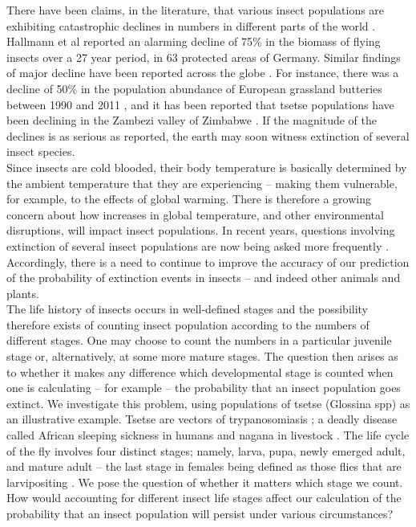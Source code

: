 \documentclass[smallextended]{svjour3}
\begin{document}
There have been claims, in the literature, that various insect populations are exhibiting catastrophic declines in numbers in different parts of the world \cite{Conrad2002,Potts2010,Ilyinykh2011,VanSwaay2013,Lister2018}. Hallmann et al \cite{Hallmann2017} reported an alarming decline of 75\% in the biomass of flying insects over a 27 year period, in 63 protected areas of Germany. Similar findings of major decline have been reported across the globe \cite{Habel2015,Pelton2019}. For instance, there was a decline of 50\% in the population abundance of European grassland butteries between 1990 and 2011 \cite{VanSwaay2013}, and it has been reported that tsetse populations have been declining in the Zambezi valley of Zimbabwe \cite{Lord2018}. If the magnitude of the declines is as serious as reported, the earth may soon witness extinction of several insect species.\\


  
Since insects are cold blooded, their body temperature is basically determined by the ambient temperature that they are experiencing – making them vulnerable, for example, to the effects of global warming. There is therefore a growing concern about how increases in global temperature, and other environmental disruptions, will impact insect populations. In recent years, questions involving extinction of several insect populations are now being asked more frequently \cite{Nilsson2017}. Accordingly, there is a need to continue to improve the accuracy of our prediction of the probability of extinction events in insects – and indeed other animals and plants. \\


The life history of insects occurs in well-defined stages and the possibility therefore exists of counting insect population according to the numbers of different stages. One may choose to count the numbers in a particular juvenile stage or, alternatively, at some more mature stages. The question then arises as to whether it makes any difference which developmental stage is counted when one is calculating – for example – the probability that an insect population goes extinct.  We investigate this problem, using populations of tsetse (Glossina spp) as an illustrative example. Tsetse are vectors of trypanosomiasis \cite{Wamwiri2016,Kioy2004}; a deadly disease called African sleeping sickness in humans and nagana in livestock \cite{Kioy2004}. The life cycle of the fly involves four distinct stages; namely, larva, pupa, newly emerged adult, and mature adult – the last stage in females being defined as those flies that are larvipositing \cite{Ackley2017a}. We pose the question of whether it matters which stage we count. How would accounting for different insect life stages affect our calculation of the probability that an insect population will persist under various circumstances? \\
\end{document}
